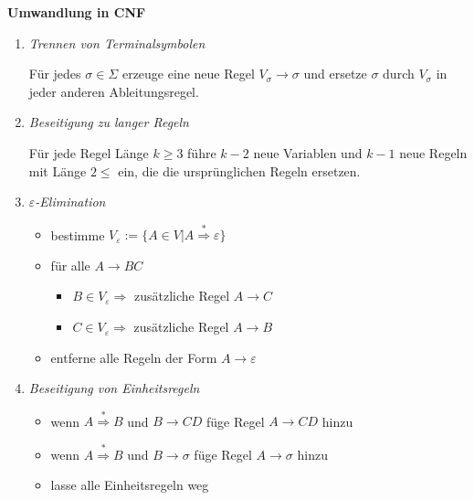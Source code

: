 \documentclass[10pt,fleqn, a4paper]{article}
\begin{document}
{\bf Umwandlung in CNF}\newline

\begin{enumerate}

\item {\it Trennen von Terminalsymbolen}

Für jedes $\sigma\in\Sigma$ erzeuge eine neue Regel $V_\sigma\rightarrow\sigma$ und ersetze $\sigma$ durch $V_\sigma$ in jeder anderen Ableitungsregel.

\item {\it Beseitigung zu langer Regeln}

Für jede Regel Länge $k\geq 3$ führe $k-2$ neue Variablen und $k-1$ neue Regeln mit Länge $2\leq$ ein, die die ursprünglichen Regeln ersetzen.

\item {\it $\varepsilon$-Elimination}

\begin{itemize}

\item bestimme $V_\varepsilon:=\{A\in V|A\overset{*}{\Rightarrow}\varepsilon\}$
\item für alle $A\rightarrow BC$
	\begin{itemize}
	
	\item $B\in V_\varepsilon\Rightarrow$ zusätzliche Regel $A\rightarrow C$
	\item $C\in V_\varepsilon\Rightarrow$ zusätzliche Regel $A\rightarrow B$
		
	\end{itemize}
	
\item entferne alle Regeln der Form $A\rightarrow\varepsilon$

\end{itemize}

\item {\it Beseitigung von Einheitsregeln}

\begin{itemize}
\item wenn $A\overset{*}{\Rightarrow}B$ und $B\rightarrow CD$ füge Regel $A\rightarrow CD$ hinzu
\item wenn $A\overset{*}{\Rightarrow}B$ und $B\rightarrow\sigma$ füge Regel $A\rightarrow\sigma$ hinzu
\item lasse alle Einheitsregeln weg
\end{itemize}

\end{enumerate}
\end{document}
